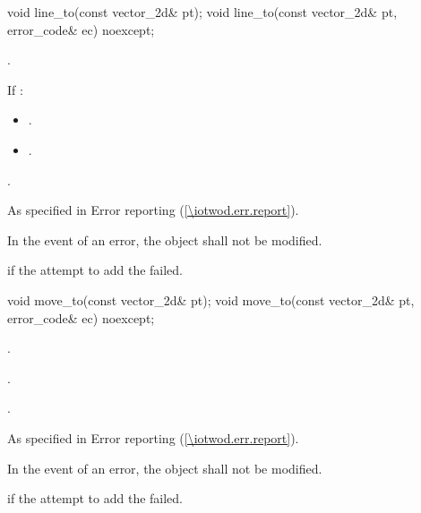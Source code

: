 \begin{itemdecl}
    void line_to(const vector_2d& pt);
    void line_to(const vector_2d& pt, error_code& ec) noexcept;
\end{itemdecl}
\begin{itemdescr}
	\pnum
	\effects
	.
	
	\pnum
	If :
	\begin{itemize}
	\item {}.
	
	\item {}.
	\end{itemize}
	
	\pnum
	.
	
	\pnum
	\throws
	As specified in Error reporting (\ref{\iotwod.err.report}).

	\pnum
	\remarks
	In the event of an error, the object shall not be modified.

	\pnum
	\errors
	 if the attempt to add the  failed.
\end{itemdescr}

\begin{itemdecl}
    void move_to(const vector_2d& pt);
    void move_to(const vector_2d& pt, error_code& ec) noexcept;
\end{itemdecl}
\begin{itemdescr}
	\pnum
	\effects
	.
	
	\pnum
	.
	
	\pnum
	.
	
	\pnum
	\throws
	As specified in Error reporting (\ref{\iotwod.err.report}).

	\pnum
	\remarks
	In the event of an error, the object shall not be modified.

	\pnum
	\errors
	 if the attempt to add the  failed.
\end{itemdescr}

